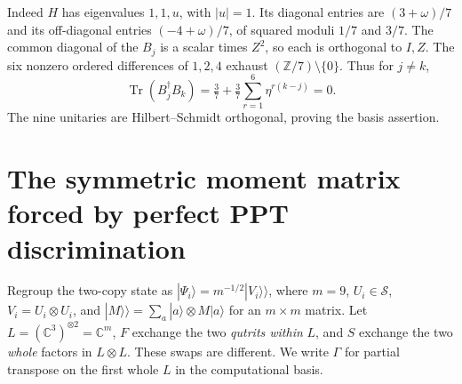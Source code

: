 \documentclass[10pt]{article}
\newcommand{\C}{\mathbb C}\newcommand{\I}{\mathbb I}\newcommand{\ket}[1]{|#1\rangle}\newcommand{\bra}[1]{\langle #1|}
\DeclareMathOperator{\Tr}{Tr}\DeclareMathOperator{\Sym}{Sym}
\begin{document}
Indeed $H$ has eigenvalues $1,1,u$, with $|u|=1$. Its diagonal entries are $(3+\omega)/7$ and its off-diagonal entries $(-4+\omega)/7$, of squared moduli $1/7$ and $3/7$. The common diagonal of the $B_j$ is a scalar times $Z^2$, so each is orthogonal to $I,Z$. The six nonzero ordered differences of $1,2,4$ exhaust $(\mathbb Z/7)\setminus\{0\}$. Thus for $j\ne k$,
\[
                  \Tr(B_j^\dagger B_k)=\tfrac37+\tfrac37\sum_{r=1}^6\eta^{r(k-j)}=0.
\]
The nine unitaries are Hilbert--Schmidt orthogonal, proving the basis assertion.

\section{The symmetric moment matrix forced by perfect PPT discrimination}
Regroup the two-copy state as $\ket{\Psi_i}=m^{-1/2}|V_i\rangle\!\rangle$, where $m=9$, $U_i\in\mathcal S$, $V_i=U_i\otimes U_i$, and $|M\rangle\!\rangle=\sum_a\ket a\otimes M\ket a$ for an $m\times m$ matrix. Let $L=(\C^3)^{\otimes2}=\C^m$, $F$ exchange the two \emph{qutrits within} $L$, and $S$ exchange the two \emph{whole} factors in $L\otimes L$. These swaps are different. We write $\Gamma$ for partial transpose on the first whole $L$ in the computational basis.
\end{document}
